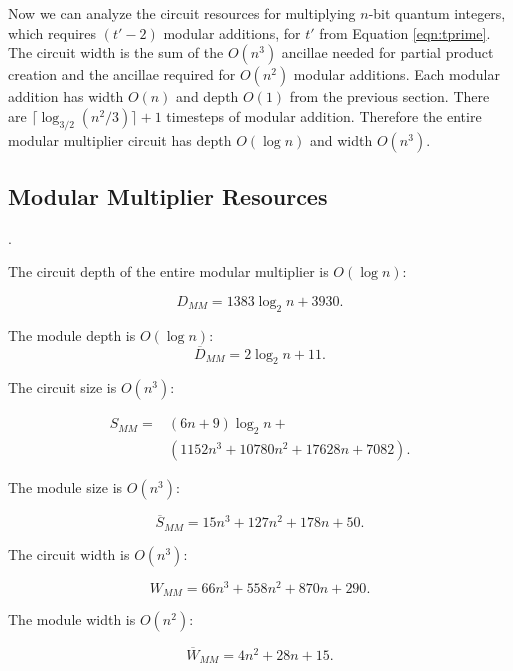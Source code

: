 \documentclass[twoside]{article}
\begin{document}
Now we can analyze the circuit resources for multiplying $n$-bit
quantum integers, which requires $(t'-2)$ modular additions, for $t'$ from
Equation \ref{eqn:tprime}.
The circuit width is the sum of the $O(n^3)$ ancillae
needed for partial product creation and the ancillae required for $O(n^2)$
modular additions. Each modular addition has width $O(n)$ and depth $O(1)$
from the previous
section. There are
$\lceil \log_{3/2}(n^2 / 3) \rceil +1 $ timesteps of modular addition. Therefore
the entire modular multiplier circuit has depth $O(\log n)$ and width $O(n^3)$.

\subsection{Modular Multiplier Resources}
\label{subsec:mod-mult-resources}.

The circuit depth of the entire modular multiplier is $O(\log n)$:

\begin{equation}
D_{MM} = 1383 \log_2 n + 3930\text{.}
\end{equation}

The module depth is $O(\log n)$:
\begin{equation}
\overline{D}_{MM} = 2\log_2 n + 11\text{.}
\end{equation}

The circuit size is $O(n^3)$:

\begin{eqnarray}
S_{MM} = & (6n + 9)\log_2 n +\\
        & (1152n^3 + 10780n^2 + 17628n + 7082)\text{.}
\end{eqnarray}

The module size is $O(n^3)$:

\begin{equation}
\overline{S}_{MM} = 15n^3 + 127n^2 + 178n + 50{.}
\end{equation}

The circuit width is $O(n^3)$:

\begin{equation}
W_{MM} = 66n^3 + 558n^2 + 870n + 290\text{.}
\end{equation}

The module width is $O(n^2)$:

\begin{equation}
\overline{W}_{MM} = 4n^2 + 28n + 15\text{.}
\end{equation}

%
\end{document}
